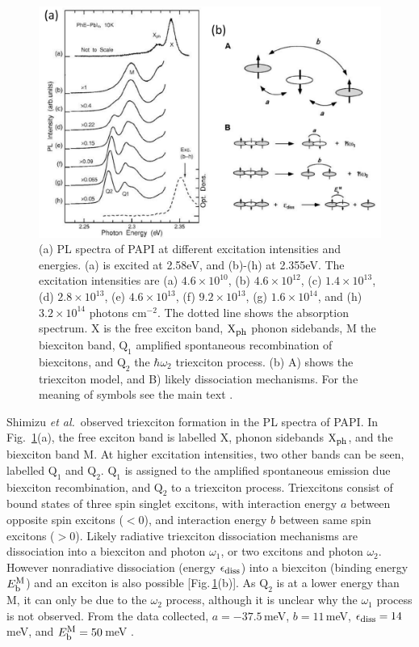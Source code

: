 \begin{figure}[h!]
\centering
\includegraphics[width=\textwidth]{Fig16}
\caption{(a) PL spectra of PAPI at different excitation intensities and energies. (a) is excited at 2.58eV, and (b)-(h) at 2.355eV. The excitation intensities are (a) $4.6\times 10^{10}$, (b) $4.6\times 10^{12}$, (c) $1.4\times 10^{13}$, (d) $2.8\times 10^{13}$, (e) $4.6\times 10^{13}$, (f) $9.2\times 10^{13}$, (g) $1.6\times 10^{14}$, and (h) $3.2\times 10^{14}$ photons c$\textrm{m}^{-2}$. The dotted line shows the absorption spectrum. X is the free exciton band, $\textrm{X}_{\textrm{\footnotesize ph}}$ phonon sidebands, M the biexciton band, $\textrm{Q}_1$ amplified spontaneous recombination of biexcitons, and $\textrm{Q}_2$ the $\hbar \omega_2$ triexciton process. (b) A) shows the triexciton model, and B) likely dissociation mechanisms. For the meaning of symbols see the main text \cite{Shimizu2006a}.}
\label{2Fig16}
\end{figure}

Shimizu \textit{et al.}\ observed triexciton formation in the PL spectra of PAPI. In Fig.\ \ref{2Fig16}(a), the free exciton band is labelled X, phonon sidebands $\textrm{X}_{\textrm{\footnotesize ph}}$, and the biexciton band M. At higher excitation intensities, two other bands can be seen, labelled $\textrm{Q}_1$ and $\textrm{Q}_2$. $\textrm{Q}_1$ is assigned to the amplified spontaneous emission due biexciton recombination, and $\textrm{Q}_2$ to a triexciton process. Triexcitons consist of bound states of three spin singlet excitons, with interaction energy $a$ between opposite spin excitons ($<0$), and interaction energy $b$ between same spin excitons ($>0$). Likely radiative triexciton dissociation mechanisms are dissociation into a biexciton and photon $\omega_1$, or two excitons and photon $\omega_2$. However nonradiative dissociation (energy $\epsilon_{\textrm{\footnotesize diss}}$) into a biexciton (binding energy $E_{\textrm{\footnotesize b}}^{\textrm{\footnotesize M}}$) and an exciton is also possible [Fig.\,\ref{2Fig16}(b)]. As $\textrm{Q}_2$ is at a lower energy than M, it can only be due to the $\omega_2$ process, although it is unclear why the $\omega_1$ process is not observed. From the data collected, $a=-37.5$\,meV, $b=11$\,meV, $\epsilon_{\textrm{\footnotesize diss}}=14$\,meV, and $E_{\textrm{\footnotesize b}}^{\textrm{\footnotesize M}}=50$\,meV \cite{Shimizu2006a}. 


